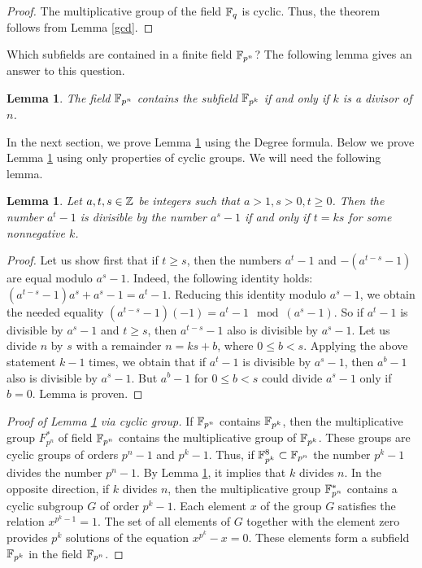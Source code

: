 \documentclass[11pt]{article}
\theoremstyle{plain}
\newtheorem{lemma}[theorem]{Lemma}
\theoremstyle{definition}
\begin{document}
\begin{proof} The multiplicative group of the field  $\Bbb F_q$ is cyclic. Thus, the theorem follows from Lemma \ref{gcd}.
\end{proof}

Which subfields are contained in a finite field $\Bbb F_{p^n}$? The following lemma gives an answer to this question.

\begin{lemma}\label{subfield} The field $\Bbb F_{p^n}$ contains the subfield $\Bbb F_{p^k}$ if and only if $k$ is a divisor of $n$.
\end{lemma}

In the next section, we  prove  Lemma \ref{subfield} using the Degree formula.
Below we prove  Lemma \ref{subfield} using only properties of cyclic groups.
We will need the following lemma.

\begin{lemma} \label{divisibility}Let $a, t,s\in \Bbb Z$ be integers such that $a>1, s>0, t\geq 0$.  Then the number $a^t-1$ is divisible by the number $a^s-1$ if and only if $t=ks$ for some nonnegative $k$.
\end{lemma}

\begin{proof} Let us  show first that if $t\geq s$, then the  numbers $a^t-1$ and $-(a^{t-s}-1)$ are equal modulo $a^s-1$. Indeed, the following identity holds: $(a^{t-s}-1) a^s +a^s-1=a^t-1$. Reducing this identity modulo $a^s-1$, we obtain the needed equality  $(a^{t-s}-1) (-1)=a^t-1 \mod (a^s-1)$.
So if $a^t-1$ is divisible by $a^s-1$ and $t\geq s$, then $a^{t-s}-1$ also is divisible by $a^s-1$. Let us divide $n$ by $s$ with a remainder $n=ks +b$, where $0\leq b<s$. Applying the above statement $k-1$ times, we obtain that if $a^t-1$ is divisible by $a^s-1$, then $a^b-1$ also is divisible by $a^s-1$. But $a^b-1$ for $0\leq b<s$ could divide $a^s-1$ only if $b=0$. Lemma is proven.
\end{proof}

\begin{proof}[Proof of Lemma \ref{subfield} via cyclic group] If $\Bbb  F_{p^n}$ contains $\Bbb F_{p^k}$, then the multiplicative group $F^*_{p^n}$ of field  $\Bbb  F_{p^n}$ contains the multiplicative group of $\Bbb F_{p^k}$. These groups are  cyclic groups of orders $p^n-1$ and $p^k-1$.
Thus, if $\Bbb F^8_{p^k}\subset \Bbb F_{p^n}$ the number $p^k-1$ divides the number $p^n-1$. By Lemma \ref{divisibility}, it implies that $k$ divides $n$. In the opposite direction, if $k$ divides $n$, then the multiplicative group $\Bbb F^*_{p^n}$ contains a cyclic  subgroup   $G$ of order $p^k-1$. Each element $x$  of the group $G$ satisfies the relation $x^{p^k-1}=1$. The set of all elements of $G$ together with the element zero provides $p^k$ solutions of the equation $x^{p^k}-x=0$. These elements form a subfield $\Bbb F_{p^k}$ in the field $\Bbb F_{p^n}$.
\end{proof}
\end{document}
